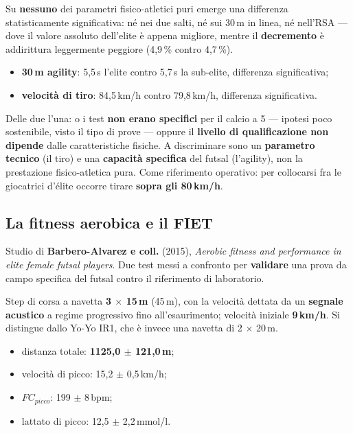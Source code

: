Su \textbf{nessuno} dei parametri fisico-atletici puri emerge una differenza statisticamente
significativa: né nei due salti, né sui 30\,m in linea, né nell'RSA --- dove il valore assoluto
dell'elite è appena migliore, mentre il \textbf{decremento} è addirittura leggermente peggiore
(4,9\,\% contro 4,7\,\%).

\begin{itemize}
  \item \textbf{30\,m agility}: 5,5\,s l'elite contro 5,7\,s la sub-elite, differenza
    significativa;
  \item \textbf{velocità di tiro}: 84,5\,km/h contro 79,8\,km/h, differenza significativa.
\end{itemize}

Delle due l'una: o i test \textbf{non erano specifici} per il calcio a 5 --- ipotesi poco
sostenibile, visto il tipo di prove --- oppure il \textbf{livello di qualificazione non dipende}
dalle caratteristiche fisiche. A discriminare sono un
\textbf{parametro tecnico} (il tiro) e una \textbf{capacità specifica} del futsal (l'agility), non
la prestazione fisico-atletica pura. Come riferimento operativo: per collocarsi fra le giocatrici
d'élite occorre tirare \textbf{sopra gli 80\,km/h}.

\subsection{La fitness aerobica e il FIET}

Studio di \textbf{Barbero-Alvarez e coll.} (2015), \textit{Aerobic fitness and performance in
elite female futsal players}. Due test messi a confronto per \textbf{validare} una prova da campo
specifica del futsal contro il riferimento di laboratorio.

Step di corsa a navetta \textbf{3 $\times$ 15\,m} (45\,m), con la velocità dettata da un
\textbf{segnale acustico} a regime progressivo fino all'esaurimento; velocità iniziale
\textbf{9\,km/h}. Si distingue dallo Yo-Yo IR1, che è invece una navetta di 2 $\times$ 20\,m.
\begin{itemize}
  \item distanza totale: \textbf{1125,0 $\pm$ 121,0\,m};
  \item velocità di picco: 15,2 $\pm$ 0,5\,km/h;
  \item $FC_{picco}$: 199 $\pm$ 8\,bpm;
  \item lattato di picco: 12,5 $\pm$ 2,2\,mmol/l.
\end{itemize}

